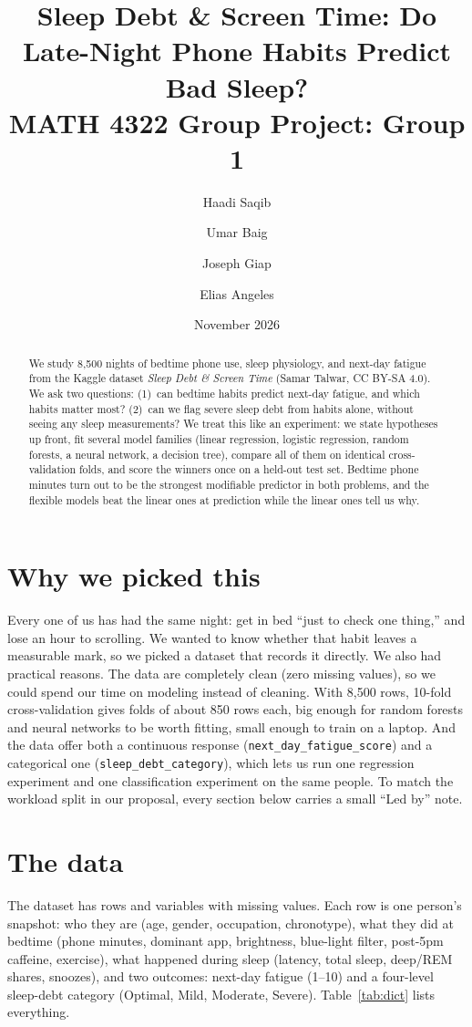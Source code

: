 \documentclass[10pt]{article}
\title{\textbf{Sleep Debt \& Screen Time: Do Late-Night Phone Habits Predict Bad Sleep?}\\[4pt]
\large MATH 4322 Group Project: Group 1}
\author{Haadi Saqib \and Umar Baig \and Joseph Giap \and Elias Angeles}
\date{November 2026}
\newcommand{\lead}[1]{\par\noindent{\small\emph{Led by #1.}}\par\smallskip}
\begin{document}
\maketitle

\begin{abstract}
\noindent We study 8,500 nights of bedtime phone use, sleep physiology, and next-day fatigue from the Kaggle dataset \emph{Sleep Debt \& Screen Time} (Samar Talwar, CC BY-SA 4.0). We ask two questions: (1)~can bedtime habits predict next-day fatigue, and which habits matter most? (2)~can we flag severe sleep debt from habits alone, without seeing any sleep measurements? We treat this like an experiment: we state hypotheses up front, fit several model families (linear regression, logistic regression, random forests, a neural network, a decision tree), compare all of them on identical cross-validation folds, and score the winners once on a held-out test set. Bedtime phone minutes turn out to be the strongest modifiable predictor in both problems, and the flexible models beat the linear ones at prediction while the linear ones tell us why.
\end{abstract}

\tableofcontents

\section{Why we picked this}
\lead{Group 1, all four of us}
Every one of us has had the same night: get in bed ``just to check one thing,'' and lose an hour to scrolling. We wanted to know whether that habit leaves a measurable mark, so we picked a dataset that records it directly. We also had practical reasons. The data are completely clean (zero missing values), so we could spend our time on modeling instead of cleaning. With 8,500 rows, 10-fold cross-validation gives folds of about 850 rows each, big enough for random forests and neural networks to be worth fitting, small enough to train on a laptop. And the data offer both a continuous response (\texttt{next\_day\_fatigue\_score}) and a categorical one (\texttt{sleep\_debt\_category}), which lets us run one regression experiment and one classification experiment on the same people. To match the workload split in our proposal, every section below carries a small ``Led by'' note.

\section{The data}
\lead{Haadi Saqib}
The dataset has \nRows{} rows and \nCols{} variables with \nMissing{} missing values. Each row is one person's snapshot: who they are (age, gender, occupation, chronotype), what they did at bedtime (phone minutes, dominant app, brightness, blue-light filter, post-5pm caffeine, exercise), what happened during sleep (latency, total sleep, deep/REM shares, snoozes), and two outcomes: next-day fatigue (1--10) and a four-level sleep-debt category (Optimal, Mild, Moderate, Severe). Table~\ref{tab:dict} lists everything.
\end{document}
